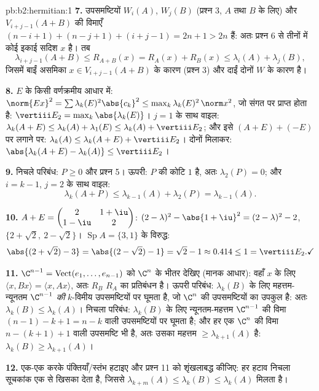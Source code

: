 \begin{solution}{pb:b2:hermitian:1}
\textbf{7.} उपसमष्टियों $W_i(A)$, $W_j(B)$ (प्रश्न 3, $A$ तथा $B$ के लिए) और $V_{i+j-1}(A+B)$ की
विमाएँ $(n-i+1) +
(n-j+1) + (i+j-1) = 2n + 1 > 2n$ हैं: अतः प्रश्न 6 से तीनों में कोई इकाई सदिश $x$ है। तब
\[
\lambda_{i+j-1}(A+B) \leq R_{A+B}(x)
= R_A(x) + R_B(x) \leq \lambda_i(A) + \lambda_j(B),
\]
जिसमें बाईं असमिका $x \in V_{i+j-1}(A+B)$ के कारण (प्रश्न 3) और दाईं दोनों $W$ के कारण है।

\textbf{8.} $E$ के किसी वर्णक्रमीय आधार में: $\norm{Ex}^2 = \sum
\lambda_k(E)^2\abs{c_k}^2 \leq \max_k\lambda_k(E)^2\,\norm
x^2$, जो संगत 
पर प्राप्त होता है: $\vertiii E_2
= \max_k\abs{\lambda_k(E)}$। $j = 1$ के साथ वाइल: $\lambda_k(A+E)
\leq \lambda_k(A) + \lambda_1(E) \leq \lambda_k(A) + \vertiii
E_2$; और इसे $(A+E) + (-E)$ पर लगाने पर:
$\lambda_k(A) \leq
\lambda_k(A+E) + \vertiii E_2$। दोनों मिलाकर: $\abs{\lambda_k(A+E) - \lambda_k(A)} \leq \vertiii E_2$।

\textbf{9.} निचले परिबंध: $P \geq 0$ और प्रश्न 5। ऊपरी: $P$ की कोटि $1$ है, अतः
$\lambda_2(P) = 0$; और $i = k-1$, $j =
2$ के साथ वाइल:
\[
\lambda_k(A + P) \leq \lambda_{k-1}(A) + \lambda_2(P)
= \lambda_{k-1}(A) .
\]

\textbf{10.} $A + E = \begin{pmatrix} 2 & 1+\iu\\ 1-\iu &
2\end{pmatrix}$:  $(2-\lambda)^2 -
\abs{1+\iu}^2 = (2-\lambda)^2 - 2$,  $\{2 + \sqrt2,\ 2
- \sqrt2\}$। $\operatorname{Sp}A = \{3, 1\}$ के विरुद्ध:
\[
\abs{(2+\sqrt2) - 3} = \abs{(2-\sqrt2) - 1} = \sqrt2 - 1
\approx 0.414 \leq 1 = \vertiii E_2 . \checkmark
\]

\textbf{11.} $\C^{n-1} = \operatorname{Vect}(e_1, \dots,
e_{n-1})$ को $\C^n$ के भीतर देखिए (मानक आधार): वहाँ $x$ के लिए $\langle x, Bx\rangle = \langle x, Ax\rangle$,
अतः $R_B$ $R_A$ का प्रतिबंधन है। ऊपरी परिबंध: $\lambda_k
(B)$ के लिए महत्तम-न्यूनतम $\C^{n-1}$
\emph{की} $k$-विमीय उपसमष्टियों पर घूमता है, जो $\C^n$ की उपसमष्टियों का
उपकुल है: अतः $\lambda_k(B) \leq
\lambda_k(A)$। निचला परिबंध: $\lambda_k(B)$ के लिए न्यूनतम-महत्तम $\C^{n-1}$ की विमा
$(n-1)-k+1 =
n-k$ वाली उपसमष्टियों पर घूमता है; और हर एक $\C^n$ की विमा $n -
(k+1) + 1$ वाली
उपसमष्टि भी है, अतः उसका महत्तम $\geq \lambda_{k+1}(A)$ है: $\lambda_k(B) \geq \lambda_{k+1}(A)$।

\textbf{12.} एक-एक करके पंक्तियाँ/स्तंभ हटाइए और प्रश्न 11 को शृंखलाबद्ध
कीजिए: हर हटाव निचला सूचकांक एक से खिसका देता है, जिससे $\lambda_{k+m}(A) \leq \lambda_k(B) \leq \lambda_k(A)$ मिलता है।


\end{solution}
